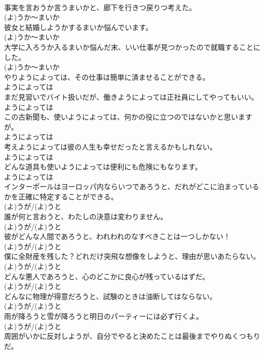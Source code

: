 \documentclass[8pt]{extreport}
\begin{document}
\begin{CJK}{UTF8}{min}
\\	事実を言おうか言うまいかと、廊下を行きつ戻りつ考えた。	
\\	(よ)うか～まいか	
\\	彼女と結婚しようかするまいか悩んでいます。	
\\	(よ)うか～まいか	
\\	大学に入ろうか入るまいか悩んだ末、いい仕事が見つかったので就職することにした。	
\\	(よ)うか～まいか	
\\	やりようによっては、その仕事は簡単に済ませることができる。	
\\	ようによっては	
\\	まだ見習いでバイト扱いだが、働きようによっては正社員にしてやってもいい。	
\\	ようによっては	
\\	この古新聞も、使いようによっては、何かの役に立つのではないかと思いますが。	
\\	ようによっては	
\\	考えようによっては彼の人生も幸せだったと言えるかもしれない。	
\\	ようによっては	
\\	どんな道具も使いようによっては便利にも危険にもなります。	
\\	ようによっては	
\\	インターポールはヨーロッパ内ならいつであろうと、だれがどこに泊まっているかを正確に特定することができる。	
\\	(よ)うが/(よ)うと	
\\	誰が何と言おうと、わたしの決意は変わりません。	
\\	(よ)うが/(よ)うと	
\\	彼がどんな人間であろうと、われわれのなすべきことは一つしかない！	
\\	(よ)うが/(よ)うと	
\\	僕に全財産を残した？どれだけ突飛な想像をしようと、理由が思いあたらない。	
\\	(よ)うが/(よ)うと	
\\	どんな悪人であろうと、心のどこかに良心が残っているはずだ。	
\\	(よ)うが/(よ)うと	
\\	どんなに物理が得意だろうと、試験のときは油断してはならない。	
\\	(よ)うが/(よ)うと	
\\	雨が降ろうと雪が降ろうと明日のパーティーには必ず行くよ。	
\\	(よ)うが/(よ)うと	
\\	周囲がいかに反対しようが、自分でやると決めたことは最後までやりぬくつもりだ。	

\end{CJK}
\end{document}
